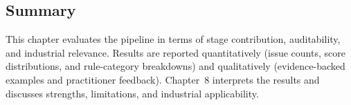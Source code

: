 \subsection{Summary}
\label{sec:eval_summary}

This chapter evaluates the pipeline in terms of stage contribution, auditability, and industrial relevance. Results are reported quantitatively (issue counts, score distributions, and rule-category breakdowns) and qualitatively (evidence-backed examples and practitioner feedback). Chapter~8 interprets the results and discusses strengths, limitations, and industrial applicability.
